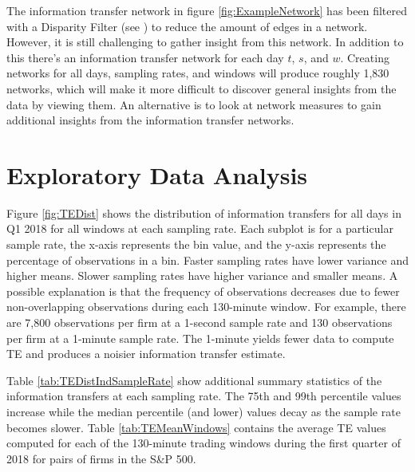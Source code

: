 The information transfer network in figure \ref{fig:ExampleNetwork} has been filtered with a Disparity Filter (see \cite{Serrano}) to reduce the amount of edges in a network.  However, it is still challenging to gather insight from this network.  In addition to this there's an information transfer network for each day $t$,  $s$,  and $w$. Creating networks for all days,  sampling rates, and windows will produce roughly 1,830 networks, which will make it more difficult to discover general insights from the data by viewing them.  An alternative is to look at network measures to gain additional insights from the information transfer networks.


\section{Exploratory Data Analysis}

Figure \ref{fig:TEDist} shows the distribution of information transfers for all days in Q1 2018 for all windows at each sampling rate.   Each subplot is for a particular sample rate,  the x-axis represents the bin value,  and the y-axis represents the percentage of observations in a bin.  Faster sampling rates have lower variance and higher means.  Slower sampling rates have higher variance and smaller means.  A possible explanation is that the frequency of observations decreases due to fewer non-overlapping observations during each 130-minute window.   For example,  there are 7,800 observations per firm at a 1-second sample rate and 130 observations per firm at a 1-minute sample rate. The 1-minute yields fewer data to compute TE and produces a noisier information transfer estimate. 

Table \ref{tab:TEDistIndSampleRate} show additional summary statistics of the information transfers at  each sampling rate.  The 75th and 99th percentile values increase while the median percentile (and lower) values decay as the sample rate becomes slower.  Table \ref{tab:TEMeanWindows} contains the average TE values computed for each of the 130-minute trading windows during the first quarter of 2018 for pairs of firms in the S\&P 500.  

